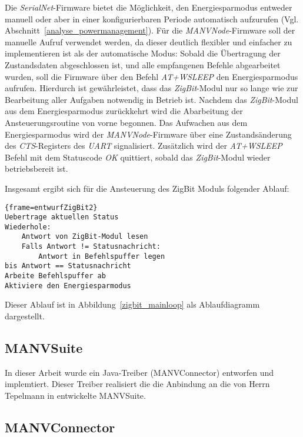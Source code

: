 Die \emph{SerialNet}-Firmware bietet die Möglichkeit, den Energiesparmodus entweder manuell oder aber in einer 
konfigurierbaren Periode automatisch aufzurufen (Vgl. Abschnitt~\ref{analyse_powermanagement}). Für die
\emph{MANVNode}-Firmware soll der manuelle Aufruf verwendet werden, da dieser deutlich flexibler und einfacher zu
implementieren ist als der automatische Modus: Sobald die Übertragung der Zustandsdaten abgeschlossen ist, und
alle empfangenen Befehle abgearbeitet wurden, soll die Firmware über den Befehl \emph{AT+WSLEEP} den Energiesparmodus
aufrufen. Hierdurch ist gewährleistet, dass das \emph{ZigBit}-Modul nur so lange wie zur Bearbeitung aller Aufgaben
notwendig in Betrieb ist. Nachdem das \emph{ZigBit}-Modul aus dem Energiesparmodus zurückkehrt wird die Abarbeitung
der Ansteuerungsroutine von vorne begonnen. Das Aufwachen aus dem Energiesparmodus wird der \emph{MANVNode}-Firmware
über eine Zustandsänderung des \emph{CTS}-Registers des \emph{UART} signalisiert. Zusätzlich wird der \emph{AT+WSLEEP}
Befehl mit dem Statuscode \emph{OK} quittiert, sobald das \emph{ZigBit}-Modul wieder betriebsbereit ist. 


Insgesamt ergibt sich für die Ansteuerung des ZigBit Moduls folgender Ablauf:

\begin{lstlisting}{frame=entwurfZigBit2}
Uebertrage aktuellen Status
Wiederhole:
    Antwort von ZigBit-Modul lesen
    Falls Antwort != Statusnachricht:
        Antwort in Befehlspuffer legen
bis Antwort == Statusnachricht    
Arbeite Befehlspuffer ab
Aktiviere den Energiesparmodus
\end{lstlisting}

Dieser Ablauf ist in Abbildung~\ref{zigbit_mainloop} als Ablaufdiagramm dargestellt.

\subsection{MANVSuite}

In dieser Arbeit wurde ein Java-Treiber (MANVConnector) entworfen und implemtiert. Dieser Treiber realisiert die die 
Anbindung an die von Herrn Tepelmann in \cite{Jan} entwickelte MANVSuite. 


\subsection{MANVConnector}


